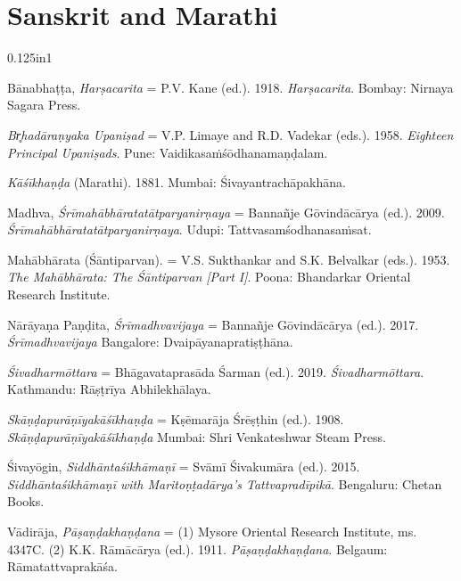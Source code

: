 \section*{Sanskrit and Marathi}
\begin{hangparas}{0.125in}{1}

          
          \label{Kane1918}Bānabhaṭṭa, \emph{{Harṣacarita}} = P.\thinskip{}V. Kane (ed.). 1918. \emph{{Harṣacarita}}. Bombay: Nirnaya Sagara Press.\medskip


	  \label{LimayeVadekar}\emph{{Br̥hadāraṇyaka Upaniṣad}} = V.\thinskip{}P. Limaye and R.\thinskip{}D. Vadekar (eds.). 1958. \emph{Eighteen Principal Upaniṣads}. Pune: Vaidikasaṁśōdhanamaṇḍalam.\medskip


          \emph{{Kāśīkhaṇḍa}} (Marathi). 1881. Mumbai: Śivayantrachāpakhāna.\medskip


          \label{Madhva2009}Madhva, \emph{{Śrīmahābhāratatātparyanirṇaya}} = Bannañje Gōvindācārya (ed.). 2009. \emph{{Śrīmahābhāratatātparyanirṇaya}}. Udupi: Tattvasamśodhanasaṁsat.\medskip


	  \label{MBh}Mahābhārata (Śāntiparvan). = V.\thinskip{}S. Sukthankar and S.\thinskip{}K. Belvalkar (eds.). 1953. \emph{The Mahābhārata: The Śāntiparvan [Part I]}. Poona: Bhandarkar Oriental Research Institute.\medskip


          \label{NarayanaPandita2017}Nārāyaṇa Paṇḍita, \emph{{Śrīmadhvavijaya}} = Bannañje Gōvindācārya (ed.). 2017. \emph{{Śrīmadhvavijaya}} Bangalore: Dvaipāyanapratiṣṭhāna.\medskip


          \label{Sivadharmottara}\emph{{Śivadharmōttara}} =  Bhāgavataprasāda Śarman (ed.). 2019. \emph{{Śivadharmōttara}}. Kathmandu:  Rāṣṭrīya Abhilekhālaya. \medskip


          \label{Kasikhanda1908}\emph{{Skāṇḍapurāṇīyakāśīkhaṇḍa}} = Kṣēmarāja Śrēṣṭhin (ed.). 1908. \emph{{Skāṇḍapurāṇīyakāśīkhaṇḍa}} Mumbai: Shri Venkateshwar Steam Press.\medskip


          \label{Sivayogin2015}Śivayōgin, \emph{{Siddhāntaśikhāmaṇī}} = Svāmī Śivakumāra (ed.). 2015. \emph{Siddhāntaśikhāmaṇī with Maritoṇṭadārya’s Tattvapradīpikā}. Bengaluru: Chetan Books.\medskip


          Vādirāja, \emph{{Pāṣaṇḍakhaṇḍana}} = (1) Mysore Oriental Research Institute, ms. 4347C. (2) K.\thinskip{}K. Rāmācārya (ed.). 1911. \emph{{Pāṣaṇḍakhaṇḍana}}. Belgaum: Rāmatattvaprakāśa.\medskip



\end{hangparas}
